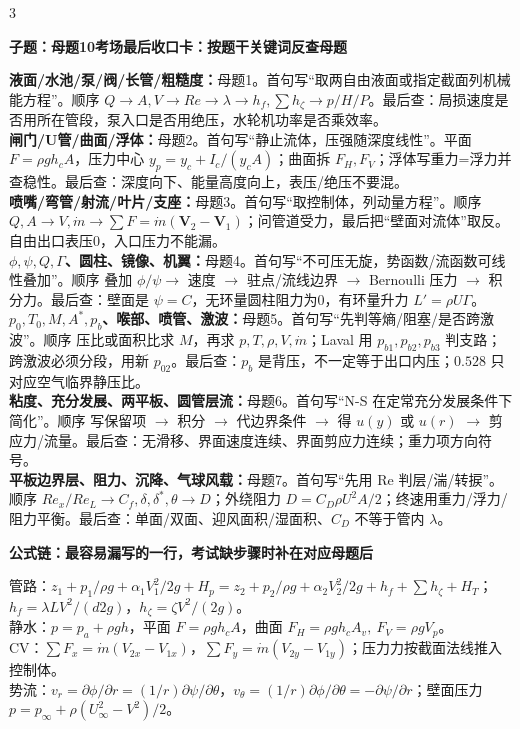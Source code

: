 \documentclass[a4paper]{article}
\newcommand{\qt}[1]{\vspace{0.25pt}\colorbox{Q}{\parbox{\dimexpr\linewidth-2\fboxsep}{\color{white}\bfseries #1}}\par}
\newcommand{\ans}[1]{\colorbox{G}{\parbox{\dimexpr\linewidth-2\fboxsep}{#1}}\par}
\begin{document}
\begin{multicols}{3}
\qt{子题：母题10考场最后收口卡：按题干关键词反查母题}
\ans{\textbf{液面/水池/泵/阀/长管/粗糙度：}母题1。首句写“取两自由液面或指定截面列机械能方程”。顺序 $Q\to A,V\to Re\to\lambda\to h_f,\sum h_\zeta\to p/H/P$。最后查：局损速度是否用所在管段，泵入口是否用绝压，水轮机功率是否乘效率。\\
\textbf{闸门/U管/曲面/浮体：}母题2。首句写“静止流体，压强随深度线性”。平面 $F=\rho gh_cA$，压力中心 $y_p=y_c+I_c/(y_cA)$；曲面拆 $F_H,F_V$；浮体写重力=浮力并查稳性。最后查：深度向下、能量高度向上，表压/绝压不要混。\\
\textbf{喷嘴/弯管/射流/叶片/支座：}母题3。首句写“取控制体，列动量方程”。顺序 $Q,A\to V,\dot m\to \sum F=\dot m(\bm V_2-\bm V_1)$；问管道受力，最后把“壁面对流体”取反。自由出口表压0，入口压力不能漏。\\
\textbf{$\phi,\psi,Q,\Gamma$、圆柱、镜像、机翼：}母题4。首句写“不可压无旋，势函数/流函数可线性叠加”。顺序 叠加 $\phi/\psi\to$ 速度 $\to$ 驻点/流线边界 $\to$ Bernoulli 压力 $\to$ 积分力。最后查：壁面是 $\psi=C$，无环量圆柱阻力为0，有环量升力 $L'=\rho U\Gamma$。\\
\textbf{$p_0,T_0,M,A^*,p_b$、喉部、喷管、激波：}母题5。首句写“先判等熵/阻塞/是否跨激波”。顺序 压比或面积比求 $M$，再求 $p,T,\rho,V,\dot m$；Laval 用 $p_{b1},p_{b2},p_{b3}$ 判支路；跨激波必须分段，用新 $p_{02}$。最后查：$p_b$ 是背压，不一定等于出口内压；$0.528$ 只对应空气临界静压比。\\
\textbf{粘度、充分发展、两平板、圆管层流：}母题6。首句写“N-S 在定常充分发展条件下简化”。顺序 写保留项 $\to$ 积分 $\to$ 代边界条件 $\to$ 得 $u(y)$ 或 $u(r)$ $\to$ 剪应力/流量。最后查：无滑移、界面速度连续、界面剪应力连续；重力项方向符号。\\
\textbf{平板边界层、阻力、沉降、气球风载：}母题7。首句写“先用 Re 判层/湍/转捩”。顺序 $Re_x/Re_L\to C_f,\delta,\delta^*,\theta\to D$；外绕阻力 $D=C_D\rho U^2A/2$；终速用重力/浮力/阻力平衡。最后查：单面/双面、迎风面积/湿面积、$C_D$ 不等于管内 $\lambda$。}
\qt{公式链：最容易漏写的一行，考试缺步骤时补在对应母题后}
\ans{管路：$z_1+p_1/\rho g+\alpha_1V_1^2/2g+H_p=z_2+p_2/\rho g+\alpha_2V_2^2/2g+h_f+\sum h_\zeta+H_T$；$h_f=\lambda L V^2/(d2g)$，$h_\zeta=\zeta V^2/(2g)$。\\
静水：$p=p_a+\rho gh$，平面 $F=\rho gh_cA$，曲面 $F_H=\rho gh_cA_v,\ F_V=\rho gV_p$。\\
CV：$\sum F_x=\dot m(V_{2x}-V_{1x})$，$\sum F_y=\dot m(V_{2y}-V_{1y})$；压力力按截面法线推入控制体。\\
势流：$v_r=\partial\phi/\partial r=(1/r)\partial\psi/\partial\theta$，$v_\theta=(1/r)\partial\phi/\partial\theta=-\partial\psi/\partial r$；壁面压力 $p=p_\infty+\rho(U_\infty^2-V^2)/2$。\\
}
\end{multicols}
\end{document}

